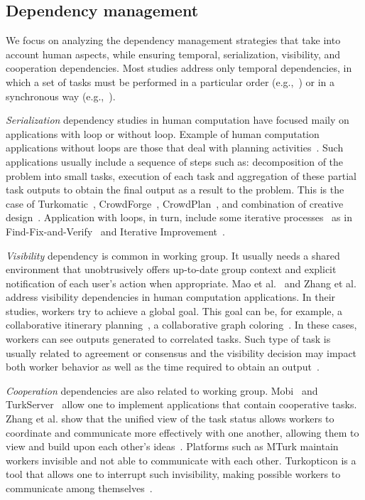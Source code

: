 \documentclass[11pt]{bmc_article_s50}
\begin{document}
\subsection{Dependency management}

We focus on analyzing the dependency management strategies that take into account human aspects, while ensuring temporal, serialization, visibility, and cooperation dependencies. Most studies address only temporal dependencies, in which a set of tasks must be performed in a particular order (e.g.,~\cite{Noronha:2011,Little2010}) or in a synchronous way (e.g.,~\cite{Kearns:2012,Mao:2011}).

\textit{Serialization} dependency studies in human computation have focused maily on applications with loop or without loop. Example of human computation applications without loops are those that deal with planning activities~\cite{LawZ11}. Such applications usually include a sequence of steps such as: decomposition of the problem into small tasks, execution of each task and aggregation of these partial task outputs to obtain the final output as a result to the problem. This is the case of Turkomatic~\cite{Kulkarni2012}, CrowdForge~\cite{Kittur2011}, CrowdPlan~\cite{LawZ11}, and combination of creative design~\cite{Yu:CHI:2011}. Application with loops, in turn, include some iterative processes~\cite{Little2010} as in Find-Fix-and-Verify~\cite{Bernstein:2010} and Iterative Improvement~\cite{dai:AAAI2010}.

\textit{Visibility} dependency is common in working group. It usually needs a shared environment that unobtrusively offers up-to-date group context and explicit notification of each user's action when appropriate. Mao et al.~\cite{Mao:2011} and Zhang et al.~\cite{Zhang:2012} address visibility dependencies in human computation applications. In their studies, workers try to achieve a global goal. This goal can be, for example, a collaborative itinerary planning~\cite{Zhang:2012}, a collaborative graph coloring~\cite{Mao:2011}. In these cases, workers can see outputs generated to correlated tasks. Such type of task is usually related to agreement or consensus and the visibility decision may impact both worker behavior as well as the time required to obtain an output~\cite{Kearns:2012}.

\textit{Cooperation} dependencies are also related to working group. Mobi~\cite{Zhang:2012} and TurkServer~\cite{Mao:2011} allow one to implement applications that contain cooperative tasks. Zhang et al. show that the unified view of the task status allows workers to coordinate and communicate more effectively with one another, allowing them to view and build upon each other's ideas~\cite{Zhang:2012}. Platforms such as MTurk maintain workers invisible and not able to communicate with each other. Turkopticon is a tool that allows one to interrupt such invisibility, making possible workers to communicate among themselves~\cite{Irani:2013}.
\end{document}

